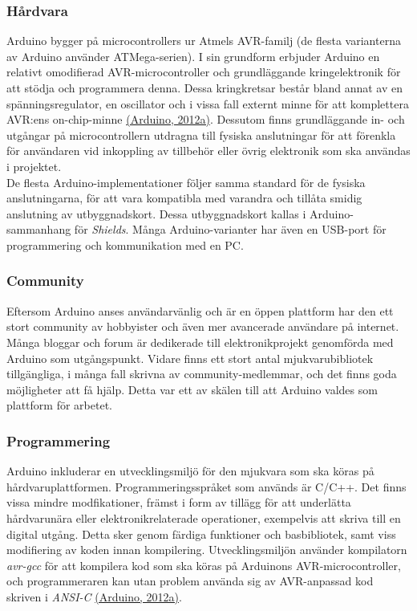\documentclass[a4paper,11pt]{article}
\begin{document}
\subsubsection{Hårdvara}
Arduino bygger på microcontrollers ur Atmels AVR-familj (de flesta varianterna av Arduino använder ATMega-serien). I sin grundform erbjuder Arduino en relativt omodifierad AVR-microcontroller och grundläggande kringelektronik för att stödja och programmera denna. Dessa kringkretsar består bland annat av en spänningsregulator, en oscillator och i vissa fall externt minne för att komplettera AVR:ens on-chip-minne \hyperref[arduino]{(Arduino, 2012a)}. Dessutom finns grundläggande in- och utgångar på microcontrollern utdragna till fysiska anslutningar för att förenkla för användaren vid inkoppling av tillbehör eller övrig elektronik som ska användas i projektet. \\

De flesta Arduino-implementationer följer samma standard för de fysiska anslutningarna, för att vara kompatibla med varandra och tillåta smidig anslutning av utbyggnadskort. Dessa utbyggnadskort kallas i Arduino-sammanhang för {\it Shields}. Många Arduino-varianter har även en USB-port för programmering och kommunikation med en PC. 

\subsubsection{Community}
Eftersom Arduino anses användarvänlig och är en öppen plattform har den ett stort community av hobbyister och även mer avancerade användare på internet. Många bloggar och forum är dedikerade till elektronikprojekt genomförda med Arduino som utgångspunkt. Vidare finns ett stort antal mjukvarubibliotek tillgängliga, i många fall skrivna av community-medlemmar, och det finns goda möjligheter att få hjälp. Detta var ett av skälen till att Arduino valdes som plattform för arbetet. \\

\subsubsection{Programmering}	
Arduino inkluderar en utvecklingsmiljö för den mjukvara som ska köras på hårdvaruplattformen. Programmeringsspråket som används är C/C++. Det finns vissa mindre modfikationer, främst i form av tillägg för att underlätta hårdvarunära eller elektronikrelaterade operationer, exempelvis att skriva till en digital utgång. Detta sker genom färdiga funktioner och basbibliotek, samt viss modifiering av koden innan kompilering. Utvecklingsmiljön använder kompilatorn {\it avr-gcc} för att kompilera kod som ska köras på Arduinons AVR-microcontroller, och programmeraren kan utan problem använda sig av AVR-anpassad kod skriven i {\it ANSI-C} \hyperref[arduino]{(Arduino, 2012a)}.
\end{document}
